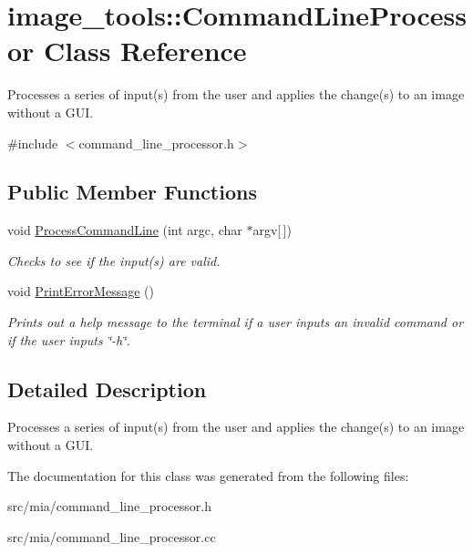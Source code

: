 \hypertarget{classimage__tools_1_1CommandLineProcessor}{}\section{image\+\_\+tools\+:\+:Command\+Line\+Processor Class Reference}
\label{classimage__tools_1_1CommandLineProcessor}


Processes a series of input(s) from the user and applies the change(s) to an image without a G\+UI.  




{\ttfamily \#include $<$command\+\_\+line\+\_\+processor.\+h$>$}

\subsection*{Public Member Functions}
\begin{DoxyCompactItemize}
\item 
\mbox{\label{classimage__tools_1_1CommandLineProcessor_aaa6f203a5fdc9687bc4c7e834e113625}} 
void \hyperlink{classimage__tools_1_1CommandLineProcessor_aaa6f203a5fdc9687bc4c7e834e113625}{Process\+Command\+Line} (int argc, char $\ast$argv\mbox{[}$\,$\mbox{]})
\begin{DoxyCompactList}\small\item\em Checks to see if the input(s) are valid. \end{DoxyCompactList}\item 
\mbox{\label{classimage__tools_1_1CommandLineProcessor_a2297f0a67e3958ec5e2260f33cf42daf}} 
void \hyperlink{classimage__tools_1_1CommandLineProcessor_a2297f0a67e3958ec5e2260f33cf42daf}{Print\+Error\+Message} ()
\begin{DoxyCompactList}\small\item\em Prints out a help message to the terminal if a user inputs an invalid command or if the user inputs \char`\"{}-\/h\char`\"{}. \end{DoxyCompactList}\end{DoxyCompactItemize}


\subsection{Detailed Description}
Processes a series of input(s) from the user and applies the change(s) to an image without a G\+UI. 

The documentation for this class was generated from the following files\+:\begin{DoxyCompactItemize}
\item 
src/mia/command\+\_\+line\+\_\+processor.\+h\item 
src/mia/command\+\_\+line\+\_\+processor.\+cc\end{DoxyCompactItemize}

